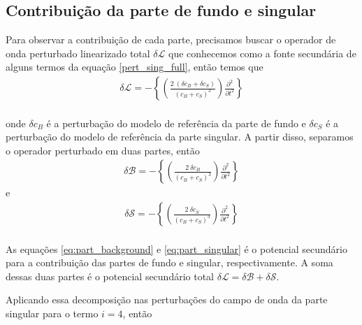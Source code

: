 \subsection{Contribuição da parte de fundo e singular}
Para observar a contribuição de cada parte, precisamos buscar o operador de onda perturbado linearizado total $\delta \mathcal{L}$ que conhecemos como a fonte secundária de alguns termos da equação \ref{pert_sing_full}, então temos que \\
\begin{eqnarray}
\delta \mathcal{L} = -  \left \{ \left(\frac{2~\left (\delta c_{B} + \delta c_{S}\right)}{\left(c_{B}+ c_{S}\right)^{3}}\right) \frac{\partial^{2}}{\partial t^{2}}\right \} 
\end{eqnarray}
\\
onde $\delta c_{B}$ é a perturbação do modelo de referência da parte de fundo e $\delta c_{S}$ é a perturbação do modelo de referência da parte singular. A partir disso, separamos o operador perturbado em duas partes, então \\
\begin{eqnarray}
\delta \mathcal{B}  = -   \left \{ \left(\frac{2~\delta c_{B}}{\left(c_{B}+ c_{S}\right)^{3}}\right) \frac{\partial^{2}}{\partial t^{2}}\right \}
\label{eq:part_background} 
\end{eqnarray}
e
\begin{eqnarray}
\delta \mathcal{S}  = -  \left \{ \left(\frac{2~\delta c_{S}}{\left(c_{B}+ c_{S}\right)^{3}}\right) \frac{\partial^{2}}{\partial t^{2}}\right \}
\label{eq:part_singular} 
\end{eqnarray}
\\
As equações \ref{eq:part_background} e \ref{eq:part_singular} é o potencial secundário para a contribuição das partes de fundo e singular, respectivamente. A soma dessas duas partes é o potencial secundário total $\delta \mathcal{L} = \delta \mathcal{B} + \delta \mathcal{S} $. 

Aplicando essa decomposição nas perturbações do campo de onda da parte singular para o termo $i=4$, então \\

